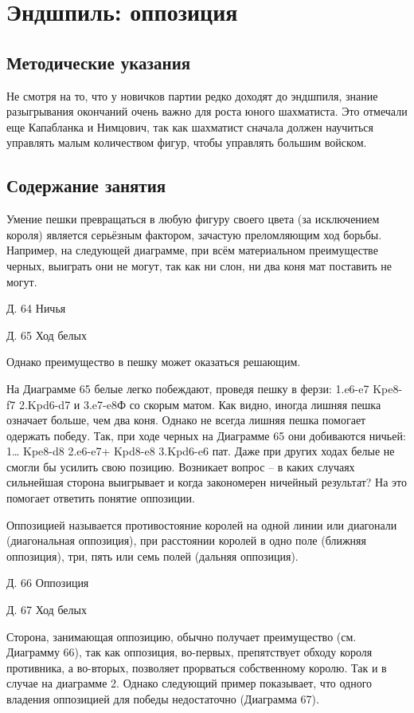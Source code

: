 \chapter{Эндшпиль: оппозиция}

\section{Методические указания}

Не смотря на то, что у новичков партии редко доходят до эндшпиля, знание разыгрывания окончаний очень важно для роста юного шахматиста. Это отмечали еще Капабланка и Нимцович, так как шахматист сначала должен научиться управлять малым количеством фигур, чтобы управлять большим войском.

\section{Содержание занятия}

Умение пешки превращаться в любую фигуру своего цвета (за исключением короля) является серьёзным фактором, зачастую преломляющим ход борьбы. Например, на следующей диаграмме, при всём материальном преимуществе черных, выиграть они не могут, так как ни слон, ни два коня мат поставить не могут.
 
 
Д. 64 Ничья
 
Д. 65 Ход белых
 

Однако преимущество в пешку может оказаться решающим.

На Диаграмме 65 белые легко побеждают, проведя пешку в ферзи: 1.e6-e7 Kpe8-f7 2.Kpd6-d7 и 3.e7-e8Ф со скорым матом. Как видно, иногда лишняя пешка означает больше, чем два коня. Однако не всегда лишняя пешка помогает одержать победу. Так, при ходе черных на Диаграмме 65 они добиваются ничьей: 1… Kpe8-d8 2.e6-e7+ Kpd8-e8 3.Kpd6-e6 пат. Даже при других ходах белые не смогли бы усилить свою позицию. Возникает вопрос – в каких случаях сильнейшая сторона выигрывает и когда закономерен ничейный результат? На это помогает ответить понятие оппозиции.

Оппозицией называется противостояние королей на одной линии или диагонали (диагональная оппозиция), при расстоянии королей в одно поле (ближняя оппозиция), три, пять или семь полей (дальняя оппозиция).
 
 
Д. 66 Оппозиция
 
Д. 67 Ход белых
 
Сторона, занимающая оппозицию, обычно получает преимущество (см. Диаграмму 66), так как оппозиция, во-первых, препятствует обходу короля противника, а во-вторых, позволяет прорваться собственному королю. Так и в случае на диаграмме 2. Однако следующий пример показывает, что одного владения оппозицией для победы недостаточно (Диаграмма 67).

